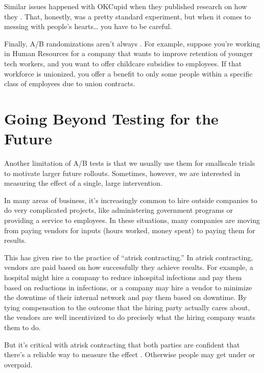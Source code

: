 \documentclass[letterpaper,10pt,english]{jupyterBook}
\begin{document}
\sphinxAtStartPar
Similar issues happened with OKCupid when they published research on how they . That, honestly, was a pretty standard experiment, but when it comes to messing with people’s hearts… you have to be careful.

\sphinxAtStartPar
Finally, A/B randomizations aren’t always . For example, suppose you’re working in Human Resources for a company that wants to improve retention of younger tech workers, and you want to offer childcare subsidies to employees. If that workforce is unionized, you  offer a benefit to only some people within a specific class of employees due to union contracts.


\section{Going Beyond Testing for the Future}
\label{\detokenize{30_questions/50_causal_beyond_ab:going-beyond-testing-for-the-future}}
\sphinxAtStartPar
Another limitation of A/B tests is that we usually use them for small\sphinxhyphen{}scale trials to motivate larger future rollouts. Sometimes, however, we are interested in measuring the effect of a single, large intervention.

\sphinxAtStartPar
In many areas of business, it’s increasingly common to hire outside companies to do very complicated projects, like administering government programs or providing a service to employees. In these situations, many companies are moving from paying vendors for inputs (hours worked, money spent) to paying them for results.

\sphinxAtStartPar
This has given rise to the practice of “at\sphinxhyphen{}risk contracting.” In at\sphinxhyphen{}risk contracting, vendors are paid based on how successfully they achieve results. For example, a hospital might hire a company to reduce in\sphinxhyphen{}hospital infections and pay them based on reductions in infections, or a company may hire a vendor to minimize the downtime of their internal network and pay them based on downtime. By tying compensation to the outcome that the hiring party actually cares about, the vendors are well incentivized to do precisely what the hiring company wants them to do.

\sphinxAtStartPar
But it’s critical with at\sphinxhyphen{}risk contracting that both parties are confident that there’s a reliable way to measure the effect . Otherwise people may get under or overpaid.
\end{document}
